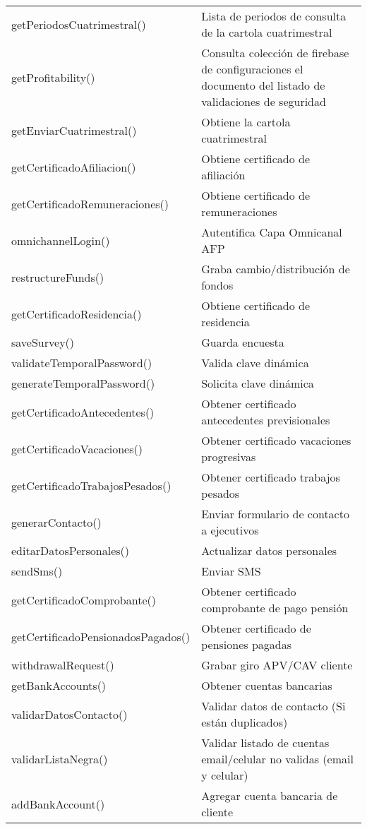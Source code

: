\begin{longtable}{|p{7cm}|p{8.5cm}|}
    getPeriodosCuatrimestral() & Lista de periodos de consulta de la cartola cuatrimestral \\
    getProfitability() & Consulta colección de firebase de configuraciones el documento del listado de validaciones de seguridad \\
    getEnviarCuatrimestral() & Obtiene la cartola cuatrimestral \\
    getCertificadoAfiliacion() & Obtiene certificado de afiliación \\
    getCertificadoRemuneraciones() & Obtiene certificado de remuneraciones \\
    omnichannelLogin() & Autentifica Capa Omnicanal AFP \\
    restructureFunds() & Graba cambio/distribución de fondos \\
    getCertificadoResidencia() & Obtiene certificado de residencia \\
    saveSurvey() & Guarda encuesta \\
    validateTemporalPassword() & Valida clave dinámica \\
    generateTemporalPassword() & Solicita clave dinámica \\
    getCertificadoAntecedentes() & Obtener certificado antecedentes previsionales \\
    getCertificadoVacaciones() & Obtener certificado vacaciones progresivas \\
    getCertificadoTrabajosPesados() & Obtener certificado trabajos pesados \\
    generarContacto() & Enviar formulario de contacto a ejecutivos \\
    editarDatosPersonales() & Actualizar datos personales \\
    sendSms() & Enviar SMS \\
    getCertificadoComprobante() & Obtener certificado comprobante de pago pensión \\
    getCertificadoPensionadosPagados() & Obtener certificado de pensiones pagadas \\
    withdrawalRequest() & Grabar giro APV/CAV cliente \\
    getBankAccounts() & Obtener cuentas bancarias \\
    validarDatosContacto() & Validar datos de contacto (Si están duplicados) \\
    validarListaNegra() & Validar listado de cuentas email/celular no validas (email y celular) \\
    addBankAccount() & Agregar cuenta bancaria de cliente \\

\end{longtable}
